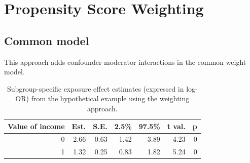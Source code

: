 \documentclass[
  letterpaper,
  DIV=11,
  numbers=noendperiod]{scrreprt}
\newenvironment{Shaded}{\begin{snugshade}}{\end{snugshade}}
\newcommand{\AttributeTok}[1]{\textcolor[rgb]{0.40,0.45,0.13}{#1}}
\newcommand{\ConstantTok}[1]{\textcolor[rgb]{0.56,0.35,0.01}{#1}}
\newcommand{\DecValTok}[1]{\textcolor[rgb]{0.68,0.00,0.00}{#1}}
\newcommand{\FunctionTok}[1]{\textcolor[rgb]{0.28,0.35,0.67}{#1}}
\newcommand{\NormalTok}[1]{\textcolor[rgb]{0.00,0.23,0.31}{#1}}
\newcommand{\OtherTok}[1]{\textcolor[rgb]{0.00,0.23,0.31}{#1}}
\newcommand{\SpecialCharTok}[1]{\textcolor[rgb]{0.37,0.37,0.37}{#1}}
\newcommand{\StringTok}[1]{\textcolor[rgb]{0.13,0.47,0.30}{#1}}
\begin{document}
\hypertarget{propensity-score-weighting-1}{%
\section{Propensity Score
Weighting}\label{propensity-score-weighting-1}}

\hypertarget{common-model}{%
\subsection{Common model}\label{common-model}}

This approach adds confounder-moderator interactions in the common
weight model.

\begin{Shaded}
\end{Shaded}

\hypertarget{tbl-common-model}{}
\begin{table}[!h]
\caption{\label{tbl-common-model}Subgroup-specific exposure effect estimates (expressed in log-OR) from
the hypothetical example using the weighting approach. }\tabularnewline

\centering
\begin{tabular}{rrrrrrr}
\toprule
Value of income & Est. & S.E. & 2.5\% & 97.5\% & t val. & p\\
\midrule
0 & 2.66 & 0.63 & 1.42 & 3.89 & 4.23 & 0\\
1 & 1.32 & 0.25 & 0.83 & 1.82 & 5.24 & 0\\
\bottomrule
\end{tabular}
\end{table}
\end{document}
